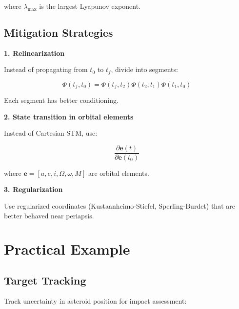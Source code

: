 where $\lambda_{\max}$ is the largest Lyapunov exponent.

\subsection{Mitigation Strategies}

\textbf{1. Relinearization}

Instead of propagating from $t_0$ to $t_f$, divide into segments:

\begin{equation}
    \Phi(t_f, t_0) = \Phi(t_f, t_2) \Phi(t_2, t_1) \Phi(t_1, t_0)
\end{equation}

Each segment has better conditioning.

\textbf{2. State transition in orbital elements}

Instead of Cartesian STM, use:

\begin{equation}
    \frac{\partial\mathbf{e}(t)}{\partial\mathbf{e}(t_0)}
\end{equation}

where $\mathbf{e} = [a, e, i, \Omega, \omega, M]$ are orbital elements.

\textbf{3. Regularization}

Use regularized coordinates (Kustaanheimo-Stiefel, Sperling-Burdet) that are better behaved near periapsis.

\section{Practical Example}

\subsection{Target Tracking}

Track uncertainty in asteroid position for impact assessment:

